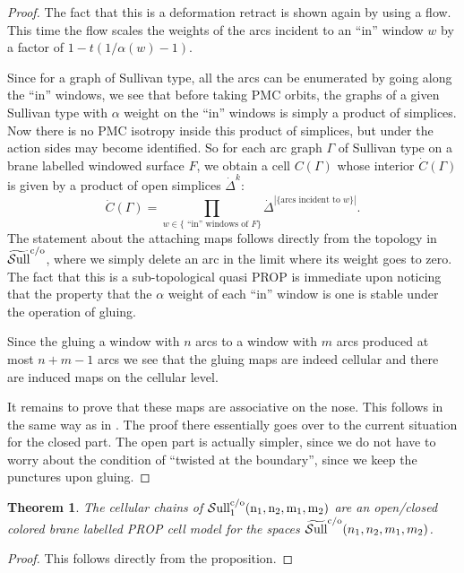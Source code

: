 \documentclass[pdftex]{sigma}
\newtheorem{thm}{Theorem}[section]
\def\Sull{\rm {\mathcal S}ull^{\rm c/o}}
\def\wSull{\widetilde{\rm {\mathcal S}ull}^{\rm c/o}}
\begin{document}
\begin{proof}
The fact that this is a deformation retract is shown again by using a f\/low. This time the f\/low
scales the weights of the arcs incident to an ``in'' window  $w$ by a factor of $1-t(1/\alpha(w)-1)$.

Since for a graph of Sullivan type, all the arcs can be enumerated
by going along the ``in'' windows, we see that before taking PMC
orbits, the graphs of a given Sullivan type with $\alpha$ weight on
the ``in'' windows is simply a product of simplices. Now there is no
PMC isotropy inside this product of simplices, but under the action
sides may become identif\/ied. So for each arc graph $\Gamma$  of
Sullivan type on a brane labelled windowed surface $F$, we obtain a
cell $C(\Gamma)$ whose interior $\dot C(\Gamma)$ is given by a
product of open simplices $\dot\Delta^k$:
\begin{equation*}
\dot  C(\Gamma) =\prod_{w \in \{\text{ ``in'' windows of $F$\}}} \dot\Delta^{|\{\text{arcs incident to $w$}\}|}.
\end{equation*}
The statement about the attaching maps follows directly from the topology in $\wSull$,
where we simply delete
an arc in the limit where its weight goes to zero.
The fact that this is a sub-topological quasi PROP is immediate upon
noticing that the property that the $\alpha$ weight of each ``in'' window is  one is stable under the operation of gluing.

Since the gluing a window with $n$ arcs to a window with $m$ arcs produced at most $n+m-1$ arcs
we see that the gluing maps are indeed cellular and there are induced maps on the cellular level.

It remains to prove that these maps are associative on the nose. This follows in the same way as in \cite[Theorem~5.33]{hoch1}.
The proof there essentially goes over to the current situation for the closed part. The open part is actually simpler,
since we do not have to worry about the condition of ``twisted at the boundary'', since we keep the punctures
upon gluing.
\end{proof}

\begin{thm}
The cellular chains of $\Sull_1(n_1,n_2,m_1,m_2)$ are an open/closed
colored brane labelled PROP cell model for the spaces
$\wSull(n_1,n_2,m_1,m_2)$.
\end{thm}

\begin{proof}
This follows directly from the proposition.
\end{proof}
\end{document}
